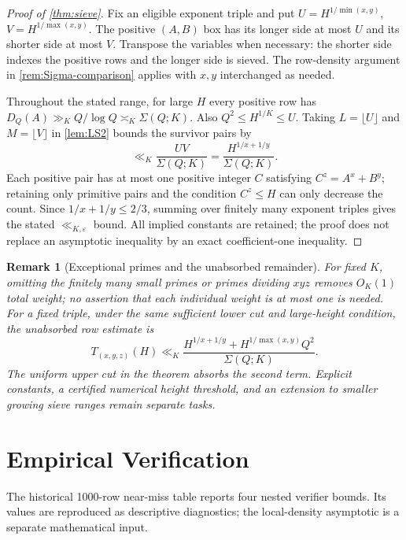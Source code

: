 \documentclass[11pt,a4paper]{article}
\newtheorem{remark}[theorem]{Remark}
\begin{document}
\begin{proof}[Proof of \cref{thm:sieve}]
Fix an eligible exponent triple and put
$U=H^{1/\min(x,y)}$, $V=H^{1/\max(x,y)}$.
The positive $(A,B)$ box has its longer side at most $U$ and its
shorter side at most $V$. Transpose the variables when necessary:
the shorter side indexes the positive rows and the longer side
is sieved. The row-density argument in
\cref{rem:Sigma-comparison} applies with $x,y$ interchanged as needed.

Throughout the stated range, for large $H$ every positive row has
$D_Q(A)\gg_K Q/\log Q\asymp_K\Sigma(Q;K)$.
Also $Q^2\le H^{1/K}\le U$.
Taking $L=\lfloor U\rfloor$ and $M=\lfloor V\rfloor$ in
\cref{lem:LS2} bounds the survivor pairs by
\[
 \ll_K\frac{UV}{\Sigma(Q;K)}
       =\frac{H^{1/x+1/y}}{\Sigma(Q;K)}.
\]
Each positive pair has at most one positive integer $C$ satisfying
$C^z=A^x+B^y$; retaining only primitive pairs and the condition
$C^z\le H$ can only decrease the count. Since $1/x+1/y\le2/3$,
summing over finitely many exponent triples gives the stated
$\ll_{K,\varepsilon}$ bound. All implied constants are retained;
the proof does not replace an asymptotic inequality by an exact
coefficient-one inequality.
\end{proof}

\begin{remark}[Exceptional primes and the unabsorbed remainder]
\label{rem:exceptional}
For fixed $K$, omitting the finitely many small primes or primes
dividing $xyz$ removes $O_K(1)$ total weight; no assertion that
each individual weight is at most one is needed.
For a fixed triple, under the same sufficient lower cut and
large-height condition, the unabsorbed row estimate is
\[
 T_{(x,y,z)}(H)\ll_K
 \frac{H^{1/x+1/y}+H^{1/\max(x,y)}Q^2}{\Sigma(Q;K)}.
\]
The uniform upper cut in the theorem absorbs the second term.
Explicit constants, a certified numerical height threshold, and
an extension to smaller growing sieve ranges remain separate tasks.
\end{remark}

\section{Empirical Verification}
\label{sec:empirical}

The historical 1000-row near-miss table reports four nested
verifier bounds. Its values are reproduced as descriptive diagnostics;
the local-density asymptotic is a separate mathematical input.
\end{document}
